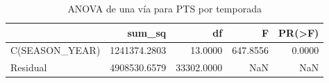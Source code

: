\begin{table}
\caption{ANOVA de una vía para PTS por temporada}
\label{tab:anova-pts}
\begin{tabular}{lrrrr}
\toprule
 & sum_sq & df & F & PR(>F) \\
\midrule
C(SEASON_YEAR) & 1241374.2803 & 13.0000 & 647.8556 & 0.0000 \\
Residual & 4908530.6579 & 33302.0000 & NaN & NaN \\
\bottomrule
\end{tabular}
\end{table}
